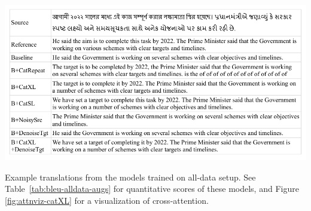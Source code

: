 \begin{table}[htb]
    \centering
    \includegraphics[width=0.98\linewidth,trim={2mm 2mm 2mm 2mm},clip]{img/robustness/example-translations.pdf}
    \caption{Example translations from the models trained on all-data setup.
    See Table~\ref{tab:bleu-alldata-augs} for quantitative scores of these models, and Figure \ref{fig:attnviz-catXL}  for a visualization of cross-attention.}
    \label{tab:fig:example-translations}
\end{table}

